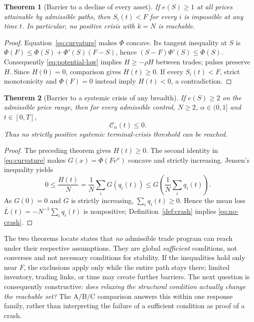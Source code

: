 \documentclass[11pt]{article}
\numberwithin{equation}{section}
\newtheorem{theorem}{Theorem}[section]
\theoremstyle{definition}
\theoremstyle{remark}
\newcommand{\Cris}{\mathcal{C}}
\begin{document}
\begin{theorem}[Barrier to a decline of every asset]\label{thm:barrier1}
If $e(S)\ge1$ at all prices attainable by admissible paths, then $S_i(t)<F$ for every $i$ is impossible at any time $t$. In particular, no positive crisis with $k=N$ is reachable.
\end{theorem}
\begin{proof}
Equation~\eqref{eq:curvature} makes $\Phi$ concave. Its tangent inequality at $S$ is $\Phi(F)\le\Phi(S)+\Phi'(S)(F-S)$, hence $(S-F)\Phi'(S)\le\Phi(S)$. Consequently \eqref{eq:potential-law} implies $\dot H\ge-\rho H$ between trades; pulses preserve $H$. Since $H(0)=0$, comparison gives $H(t)\ge0$. If every $S_i(t)<F$, strict monotonicity and $\Phi(F)=0$ instead imply $H(t)<0$, a contradiction.
\end{proof}

\begin{theorem}[Barrier to a systemic crisis of any breadth]\label{thm:barrier2}
If $e(S)\ge2$ on the admissible price range, then for every admissible control, $N\ge2$, $\alpha\in(0,1]$ and $t\in[0,T]$,
\begin{equation}\label{eq:no-crash}
\boxed{\Cris_\alpha(t)\le0.}
\end{equation}
Thus no strictly positive systemic terminal-crisis threshold can be reached.
\end{theorem}
\begin{proof}
The preceding theorem gives $H(t)\ge0$. The second identity in \eqref{eq:curvature} makes $G(x)=\Phi(Fe^x)$ concave and strictly increasing. Jensen's inequality yields
\[
0\le\frac{H(t)}N=\frac1N\sum_iG(q_i(t))
\le G\!\left(\frac1N\sum_iq_i(t)\right).
\]
As $G(0)=0$ and $G$ is strictly increasing, $\sum_iq_i(t)\ge0$. Hence the mean loss $\overline L(t)=-N^{-1}\sum_iq_i(t)$ is nonpositive; Definition~\ref{def:crash} implies \eqref{eq:no-crash}.
\end{proof}

The two theorems locate states that \emph{no} admissible trade program can reach under their respective assumptions. They are global \emph{sufficient} conditions, not converses and not necessary conditions for stability. If the inequalities hold only near $F$, the exclusions apply only while the entire path stays there; limited inventory, trading links, or time may create further barriers. The next question is consequently constructive: \emph{does relaxing the structural condition actually change the reachable set?} The A/B/C comparison answers this within one response family, rather than interpreting the failure of a sufficient condition as proof of a crash.
\end{document}
